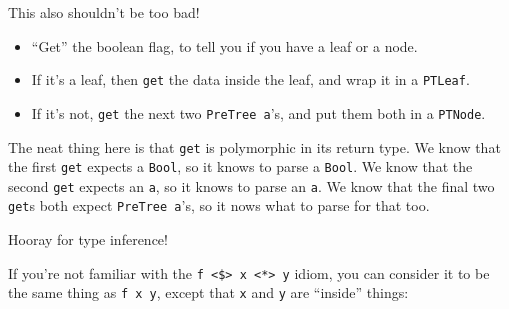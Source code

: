 \documentclass[]{article}
\newenvironment{Shaded}{}{}
\newcommand{\CommentTok}[1]{\textcolor[rgb]{0.38,0.63,0.69}{\textit{#1}}}
\newcommand{\DataTypeTok}[1]{\textcolor[rgb]{0.56,0.13,0.00}{#1}}
\newcommand{\DecValTok}[1]{\textcolor[rgb]{0.25,0.63,0.44}{#1}}
\newcommand{\KeywordTok}[1]{\textcolor[rgb]{0.00,0.44,0.13}{\textbf{#1}}}
\newcommand{\NormalTok}[1]{#1}
\newcommand{\OperatorTok}[1]{\textcolor[rgb]{0.40,0.40,0.40}{#1}}
\newcommand{\OtherTok}[1]{\textcolor[rgb]{0.00,0.44,0.13}{#1}}
\begin{document}
\begin{Shaded}
\end{Shaded}

This also shouldn't be too bad!

\begin{itemize}
\tightlist
\item
  ``Get'' the boolean flag, to tell you if you have a leaf or a node.
\item
  If it's a leaf, then \texttt{get} the data inside the leaf, and wrap it in a
  \texttt{PTLeaf}.
\item
  If it's not, \texttt{get} the next two \texttt{PreTree\ a}'s, and put them
  both in a \texttt{PTNode}.
\end{itemize}

The neat thing here is that \texttt{get} is polymorphic in its return type. We
know that the first \texttt{get} expects a \texttt{Bool}, so it knows to parse a
\texttt{Bool}. We know that the second \texttt{get} expects an \texttt{a}, so it
knows to parse an \texttt{a}. We know that the final two \texttt{get}s both
expect \texttt{PreTree\ a}'s, so it nows what to parse for that too.

Hooray for type inference!

If you're not familiar with the
\texttt{f\ \textless{}\$\textgreater{}\ x\ \textless{}*\textgreater{}\ y} idiom,
you can consider it to be the same thing as \texttt{f\ x\ y}, except that
\texttt{x} and \texttt{y} are ``inside'' things:

\begin{Shaded}
\end{Shaded}
\end{document}
